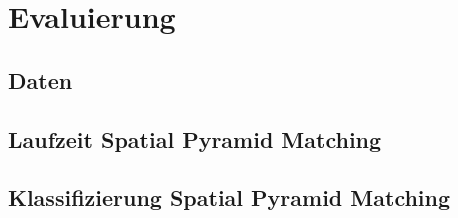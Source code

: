 \section{Evaluierung}

\subsection{Daten}

\subsection{Laufzeit Spatial Pyramid Matching}

\subsection{Klassifizierung Spatial Pyramid Matching}
